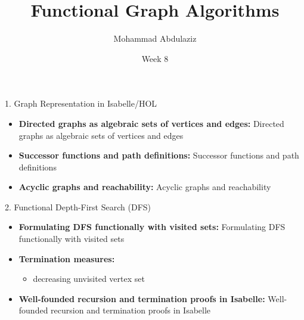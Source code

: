 \documentclass[compress,10pt,xcolor=dvipsnames]{beamer}
\title[Functional Graph Algorithms]{Functional Graph Algorithms}
\author[7CCSACTP]{Mohammad Abdulaziz}
\date{Week 8}
\begin{document}

\begin{frame}{1. Graph Representation in Isabelle/HOL}

\begin{itemize}
  \item \textbf{Directed graphs as algebraic sets of vertices and edges:} Directed graphs as algebraic sets of vertices and edges
  \item \textbf{Successor functions and path definitions:} Successor functions and path definitions
  \item \textbf{Acyclic graphs and reachability:} Acyclic graphs and reachability
\end{itemize}
\end{frame}

\begin{frame}{2. Functional Depth-First Search (DFS)}

\begin{itemize}
  \item \textbf{Formulating DFS functionally with visited sets:} Formulating DFS functionally with visited sets
  \item \textbf{Termination measures:}
    \begin{itemize}
      \item decreasing unvisited vertex set
    \end{itemize}
  \item \textbf{Well-founded recursion and termination proofs in Isabelle:} Well-founded recursion and termination proofs in Isabelle
\end{itemize}
\end{frame}
\end{document}
